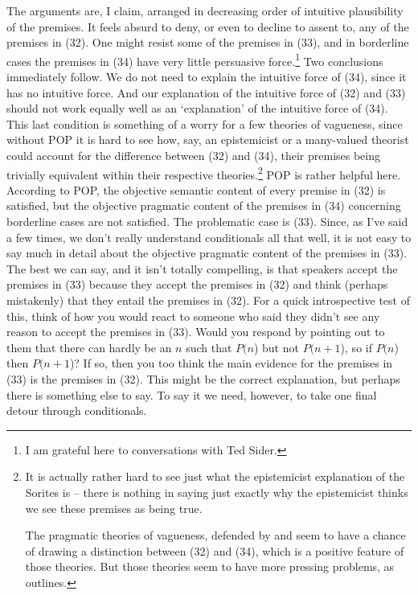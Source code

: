 \noindent The arguments are, I claim, arranged in decreasing order of intuitive plausibility of the premises. It feels absurd to deny, or even to decline to assent to, any of the premises in (32). One might resist some of the premises in (33), and in borderline cases the premises in (34) have very little persuasive force.\footnote{I am grateful here to conversations with Ted Sider.} Two conclusions immediately follow. We do not need to explain the intuitive force of (34), since it has no intuitive force. And our explanation of the intuitive force of (32) and (33) should not work equally well as an `explanation' of the intuitive force of (34). This last condition is something of a worry for a few theories of vagueness, since without POP it is hard to see how, say, an epistemicist or a many-valued theorist could account for the difference between (32) and (34), their premises being trivially equivalent within their respective theories.\footnote{It is actually rather hard to see just what the epistemicist explanation of the Sorites is -- there is nothing in \citet{Williamson1994-WILV} saying just exactly why the epistemicist thinks we see these premises as being true.\par The pragmatic theories of vagueness, defended by \citet{Raffman1994} and \citet{Soames1999} seem to have a chance of drawing a distinction between (32) and (34), which is a positive feature of those theories. But those theories seem to have more pressing problems, as \citet{Robertson2000} outlines. } POP is rather helpful here. According to POP, the objective semantic content of every premise in (32) is satisfied, but the objective pragmatic content of the premises in (34) concerning borderline cases are not satisfied. The problematic case is (33). Since, as I've said a few times, we don't really understand conditionals all that well, it is not easy to say much in detail about the objective pragmatic content of the premises in (33). The best we can say, and it isn't totally compelling, is that speakers accept the premises in (33) because they accept the premises in (32) and think (perhaps mistakenly) that they entail the premises in (32). For a quick introspective test of this, think of how you would react to someone who said they didn't see any reason to accept the premises in (33). Would you respond by pointing out to them that there can hardly be an \(n\) such that \(P(n\)) but not \(P(n+1\)), so if \(P(n\)) then \(P(n+1\))? If so, then you too think the main evidence for the premises in (33) is the premises in (32). This might be the correct explanation, but perhaps there is something else to say. To say it we need, however, to take one final detour through conditionals.

